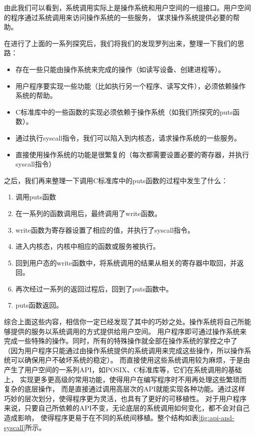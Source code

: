 由此我们可以看到，系统调用实际上是操作系统和用户空间的一组接口。用户空间的程序通过系统调用来访问操作系统的一些服务，
谋求操作系统提供必要的帮助。

在进行了上面的一系列探究后，我们将我们的发现罗列出来，整理一下我们的思路：
\begin{itemize}
  \item 存在一些只能由操作系统来完成的操作（如读写设备、创建进程等）。
  \item 用户程序要实现一些功能（比如执行另一个程序、读写文件），必须依赖操作系统的帮助。
  \item C标准库中的一些函数的实现必须依赖于操作系统（如我们所探究的puts函数）。
  \item 通过执行syscall指令，我们可以陷入到内核态，请求操作系统的一些服务。
  \item 直接使用操作系统的功能是很繁复的（每次都需要设置必要的寄存器，并执行syscall指令）
\end{itemize}

之后，我们再来整理一下调用C标准库中的puts函数的过程中发生了什么：
\begin{enumerate}
  \item 调用puts函数
  \item 在一系列的函数调用后，最终调用了write函数。
  \item write函数为寄存器设置了相应的值，并执行了syscall指令。
  \item 进入内核态，内核中相应的函数或服务被执行。
  \item 回到用户态的write函数中，将系统调用的结果从相关的寄存器中取回，并返回。
  \item 再次经过一系列的返回过程后，回到了puts函数中。
  \item puts函数返回。
\end{enumerate}

综合上面这些内容，相信你一定已经发现了其中的巧妙之处。操作系统将自己所能够提供的服务以系统调用的方式提供给用户空间。
用户程序即可通过操作系统来完成一些特殊的操作。同时，所有的特殊操作就全部在操作系统的掌控之中了
（因为用户程序只能通过由操作系统提供的系统调用来完成这些操作，所以操作系统可以确保用户不破坏系统的稳定）。
而直接使用这些系统调用较为麻烦，于是由产生了用户空间的一系列API，如POSIX、C标准库等，它们在系统调用的基础上，
实现更多更高级的常用功能，使得用户在编写程序时不用再处理这些繁琐而复杂的底层操作，
而是直接通过调用高层次的API就能实现各种功能。通过这样巧妙的层次划分，使得程序更为灵活，也具有了更好的可移植性。
对于用户程序来说，只要自己所依赖的API不变，无论底层的系统调用如何变化，都不会对自己造成影响，
使得程序更易于在不同的系统间移植。整个结构如表\ref{fig:api-and-syscall}所示。

